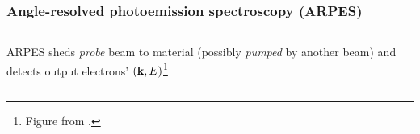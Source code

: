 \documentclass[t]{beamer}
\begin{document}
\begin{frame}
\frametitle{Angle-resolved photoemission spectroscopy (ARPES)}

\vspace{0.3cm}

\begin{columns}

\begin{column}{0.3\textwidth}
    \begin{minipage}{\columnwidth}
        ARPES sheds \emph{probe} beam to material (possibly \emph{pumped} by another beam) and detects output electrons' $(\vb{k}, E)$\footnote{
            Figure from \cite{rosenzweig2022surface}.
        }

    \end{minipage}
\end{column}

\begin{column}{0.7\textwidth}
\begin{minipage}{\columnwidth}
    \begin{center}
        \begin{tikzpicture}[x=0.75pt,y=0.75pt,yscale=-0.7,xscale=0.7]
            

\end{tikzpicture}
\end{center}
\end{minipage}
\end{column}
\end{columns}
\end{frame}
\end{document}
